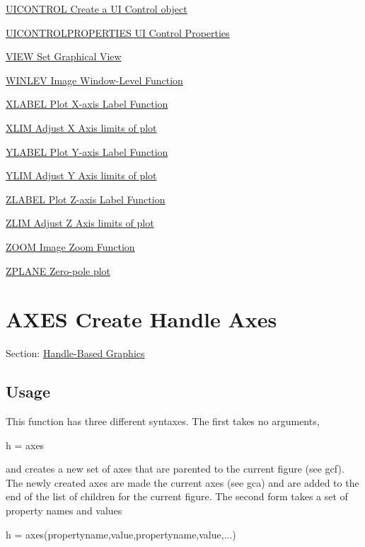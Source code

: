 \begin{DoxyItemize}
\item \hyperlink{handle_uicontrol}{U\-I\-C\-O\-N\-T\-R\-O\-L Create a U\-I Control object}  
\item \hyperlink{handle_uicontrolproperties}{U\-I\-C\-O\-N\-T\-R\-O\-L\-P\-R\-O\-P\-E\-R\-T\-I\-E\-S U\-I Control Properties}  
\item \hyperlink{handle_view}{V\-I\-E\-W Set Graphical View}  
\item \hyperlink{handle_winlev}{W\-I\-N\-L\-E\-V Image Window-\/\-Level Function}  
\item \hyperlink{handle_xlabel}{X\-L\-A\-B\-E\-L Plot X-\/axis Label Function}  
\item \hyperlink{handle_xlim}{X\-L\-I\-M Adjust X Axis limits of plot}  
\item \hyperlink{handle_ylabel}{Y\-L\-A\-B\-E\-L Plot Y-\/axis Label Function}  
\item \hyperlink{handle_ylim}{Y\-L\-I\-M Adjust Y Axis limits of plot}  
\item \hyperlink{handle_zlabel}{Z\-L\-A\-B\-E\-L Plot Z-\/axis Label Function}  
\item \hyperlink{handle_zlim}{Z\-L\-I\-M Adjust Z Axis limits of plot}  
\item \hyperlink{handle_zoom}{Z\-O\-O\-M Image Zoom Function}  
\item \hyperlink{handle_zplane}{Z\-P\-L\-A\-N\-E Zero-\/pole plot}  
\end{DoxyItemize}\hypertarget{handle_axes}{}\section{A\-X\-E\-S Create Handle Axes}\label{handle_axes}
Section\-: \hyperlink{sec_handle}{Handle-\/\-Based Graphics} \hypertarget{vtkwidgets_vtkxyplotwidget_Usage}{}\subsection{Usage}\label{vtkwidgets_vtkxyplotwidget_Usage}
This function has three different syntaxes. The first takes no arguments, \begin{DoxyVerb}  h = axes
\end{DoxyVerb}
 and creates a new set of axes that are parented to the current figure (see {\ttfamily gcf}). The newly created axes are made the current axes (see {\ttfamily gca}) and are added to the end of the list of children for the current figure. The second form takes a set of property names and values \begin{DoxyVerb}  h = axes(propertyname,value,propertyname,value,...)
\end{DoxyVerb}
